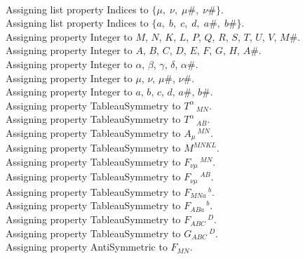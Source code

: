 \documentclass[11pt]{article}
\begin{document}
\\
Assigning list property Indices to $\{\mu,\; \nu,\; \mu\#,\; \nu\#\}$.
\\
Assigning list property Indices to $\{a,\; b,\; c,\; d,\; a\#,\; b\#\}$.
\\
Assigning property Integer to $M$, $N$, $K$, $L$, $P$, $Q$, $R$, $S$, $T$, $U$, $V$, $M\#$.
\\
Assigning property Integer to $A$, $B$, $C$, $D$, $E$, $F$, $G$, $H$, $A\#$.
\\
Assigning property Integer to $\alpha$, $\beta$, $\gamma$, $\delta$, $\alpha\#$.
\\
Assigning property Integer to $\mu$, $\nu$, $\mu\#$, $\nu\#$.
\\
Assigning property Integer to $a$, $b$, $c$, $d$, $a\#$, $b\#$.
\\
Assigning property TableauSymmetry to ${T}^{\alpha}\,_{M N}$.
\\
Assigning property TableauSymmetry to ${T}^{\alpha}\,_{A B}$.
\\
Assigning property TableauSymmetry to ${A}_{\mu}\,^{M N}$.
\\
Assigning property TableauSymmetry to ${M}^{M N K L}$.
\\
Assigning property TableauSymmetry to ${F}_{\nu \mu}\,^{M N}$.
\\
Assigning property TableauSymmetry to ${F}_{\nu \mu}\,^{A B}$.
\\
Assigning property TableauSymmetry to ${F}_{M N a}\,^{b}$.
\\
Assigning property TableauSymmetry to ${F}_{A B a}\,^{b}$.
\\
Assigning property TableauSymmetry to ${F}_{A B C}\,^{D}$.
\\
Assigning property TableauSymmetry to ${G}_{A B C}\,^{D}$.
\\
Assigning property AntiSymmetric to ${F}_{M N}$.
\end{document}
